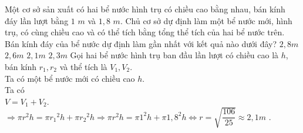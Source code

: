\begin{ex}%
	Một cơ sở sản xuất có hai bể nước hình trụ có chiều cao bằng nhau, bán kính đáy lần lượt bằng $1\,\,m$ và $1,8\,\,m$. Chủ cơ sở dự định làm một bể nước mới, hình trụ, có cùng chiều cao và có thể tích bằng tổng thể tích của hai bể nước trên. Bán kính đáy của bể nước dự định làm gần nhất với kết quả nào dưới đây?
	\choice
	{$2,8m$}
	{$2,6m$}
	{\True$2,1m$}
	{$2,3m$}
	\loigiai
	{Gọi hai bể nước hình trụ ban đầu lần lượt có chiều cao là $h$, bán kính $r_1,r_2$ và thể tích là $V_1,V_2$.\\
		Ta có một bể nước mới có chiều cao $h$.\\
		Ta có\\ 
		$V=V_1+V_2$.\\
		$\Rightarrow\pi{r^2}h=\pi{r_1}^2h+\pi{r_2}^2h\Rightarrow\pi{r^2}h=\pi{1^2}h+\pi{1,8^2}h\Leftrightarrow r=\sqrt{\dfrac{106}{25}} \approx 2,1m$ .}
\end{ex}
